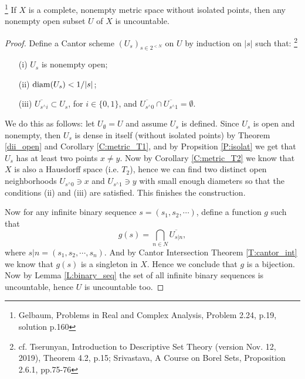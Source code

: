 \begin{lemma} \label{L:dii_uncount}
\footnote{Gelbaum, Problems in Real and Complex Analysis,  Problem 2.24, p.19, 
solution p.160}
If $X$ is a complete, nonempty metric space without isolated points, then any
nonempty open subset $U$ of $X$ is uncountable.
\end{lemma}
\begin{proof}
Define a Cantor scheme $(U_s)_{s\in 2^{<N}}$ on $U$ by induction on $|s|$ such
that:
\footnote{cf. Tserunyan, Introduction to Descriptive Set Theory (version Nov.
  12, 2019), Theorem 4.2, p.15; 
  Srivastava, A Course on Borel Sets, Proposition 2.6.1, pp.75-76}
\begin{enumerate}
  \item[(i)] $U_s$ is nonempty open;
  \item[(ii)] $\operatorname*{diam}(U_s)<1/|s|$;
  \item[(iii)] $\overline{U_{s^\wedge i}}\subset U_s$, for $i\in \{0,1\}$, 
               and $\overline{U_{s^\wedge 0}}\cap 
                    \overline{U_{s^\wedge 1}}=\emptyset$.
\end{enumerate}
We do this as follows: let $U_{\emptyset}=U$ and assume $U_s$ is defined. 
Since $U_s$ is open and nonempty, then $U_s$ is dense in itself (without
isolated points) by Theorem \ref{dii_open} and Corollary \ref{C:metric_T1},
and by Propsition \ref{P:isolat} we get that $U_s$ has at least two points 
$x\neq y$. Now by Corollary \ref{C:metric_T2} 
we know that $X$ is also a Hausdorff space (i.e. $T_2$), hence we can find
two distinct open neighborhoods $U_{s^\wedge 0}\ni x$ and 
$U_{s^\wedge 1}\ni y$ with small enough diameters so that the conditions (ii)
and (iii) are satisfied. This finishes the construction.

Now for any infinite binary sequence $s=(s_1,s_2,\cdots)$, define a function $g$
such that
\[
  g(s) = \bigcap_{n\in N} \overline{U_{s|n}},
\]
where $s|n=(s_1,s_2,\cdots,s_n)$.
And by Cantor Intersection Theorem \ref{T:cantor_int} we know that $g(s)$ is a
singleton in $X$. Hence we conclude that $g$ is a bijection. Now by Lemma
\ref{L:binary_seq} the set of all infinite binary sequences is uncountable,
hence $U$ is uncountable too.




\end{proof}
